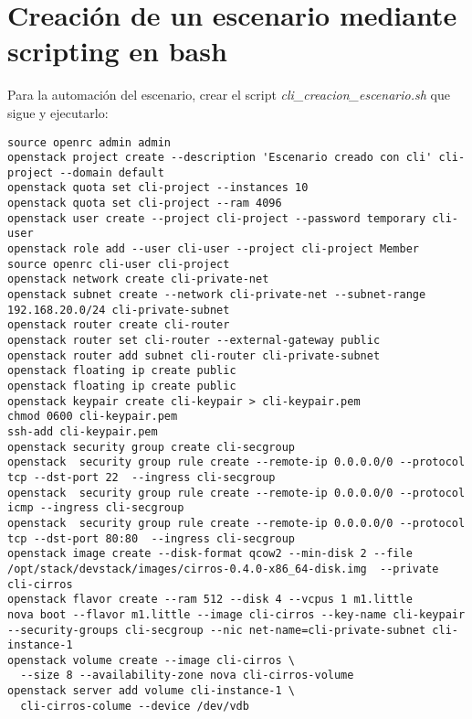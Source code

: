 \chapter{Creación de un escenario mediante scripting en bash} \label{chap:creacionescenariobash}

Para la automación del escenario, crear el script \textit{cli\_creacion\_escenario.sh} que sigue y ejecutarlo:

\begin{lstlisting}[style=Consola]
source openrc admin admin
openstack project create --description 'Escenario creado con cli' cli-project --domain default
openstack quota set cli-project --instances 10
openstack quota set cli-project --ram 4096 
openstack user create --project cli-project --password temporary cli-user
openstack role add --user cli-user --project cli-project Member
source openrc cli-user cli-project
openstack network create cli-private-net
openstack subnet create --network cli-private-net --subnet-range 192.168.20.0/24 cli-private-subnet
openstack router create cli-router
openstack router set cli-router --external-gateway public
openstack router add subnet cli-router cli-private-subnet
openstack floating ip create public
openstack floating ip create public
openstack keypair create cli-keypair > cli-keypair.pem
chmod 0600 cli-keypair.pem
ssh-add cli-keypair.pem
openstack security group create cli-secgroup
openstack  security group rule create --remote-ip 0.0.0.0/0 --protocol tcp --dst-port 22  --ingress cli-secgroup
openstack  security group rule create --remote-ip 0.0.0.0/0 --protocol icmp --ingress cli-secgroup
openstack  security group rule create --remote-ip 0.0.0.0/0 --protocol tcp --dst-port 80:80  --ingress cli-secgroup
openstack image create --disk-format qcow2 --min-disk 2 --file /opt/stack/devstack/images/cirros-0.4.0-x86_64-disk.img  --private cli-cirros
openstack flavor create --ram 512 --disk 4 --vcpus 1 m1.little
nova boot --flavor m1.little --image cli-cirros --key-name cli-keypair --security-groups cli-secgroup --nic net-name=cli-private-subnet cli-instance-1
openstack volume create --image cli-cirros \
  --size 8 --availability-zone nova cli-cirros-volume
openstack server add volume cli-instance-1 \
  cli-cirros-colume --device /dev/vdb
\end{lstlisting}